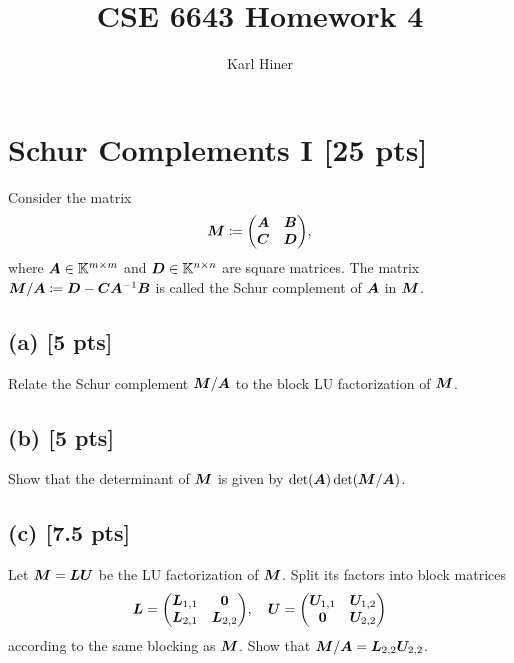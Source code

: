 \documentclass[twoside,10pt]{article}
\begin{document}
\title{CSE 6643 Homework 4}
\author{Karl Hiner}
\date{}
\maketitle

\section{Schur Complements I [25 pts]}
Consider the matrix 
\begin{equation}
  \mtx{M}
  \coloneqq
  \begin{pmatrix}
    \mtx{A} & \mtx{B}\\
    \mtx{C} & \mtx{D}
  \end{pmatrix}, 
\end{equation}
where $\bm{A} \in \mathbb{K}^{m \times m}$ and $\bm{D} \in \mathbb{K}^{n \times n}$ are square matrices.
The matrix $\bm{M}/\bm{A} \coloneqq \bm{D} - \bm{C} \bm{A}^{-1} \bm{B}$ is called the Schur complement of $\bm{A}$ in $\bm{M}$.    

\subsection*{(a) [5 pts]} 
  Relate the Schur complement $\bm{M} / \bm{A}$ to the block LU factorization of $\bm{M}$.

\subsection*{(b) [5 pts]} 
  Show that the determinant of $\bm{M}$ is given by $\det\left(\mtx{A}\right) \det\left(\mtx{M} / \mtx{A}\right)$.

\subsection*{(c) [7.5 pts]}
  Let $\bm{M} = \bm{L} \bm{U}$ be the LU factorization of $\bm{M}$. 
  Split its factors into block matrices 
  \begin{equation} 
    \mtx{L} = 
    \begin{pmatrix}
      \mtx{L}_{1, 1} & \mtx{0} \\
      \mtx{L}_{2, 1} & \mtx{L}_{2, 2}
    \end{pmatrix},
    \quad 
    \mtx{U} = 
    \begin{pmatrix}
      \mtx{U}_{1, 1} & \mtx{U}_{1, 2} \\
      \mtx{0} & \mtx{U}_{2, 2}
    \end{pmatrix}
  \end{equation}
  according to the same blocking as $\bm{M}$.
  Show that $\bm{M} / \bm{A} = \bm{L}_{2, 2} \bm{U}_{2, 2}$. 
\end{document}
